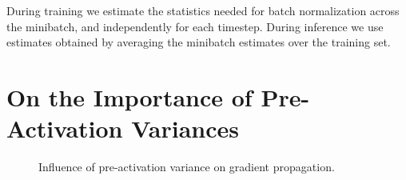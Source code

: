 \documentclass{article} %
\begin{document}

During training we estimate the statistics needed for batch normalization across the minibatch, and independently for each timestep.
During inference we use estimates obtained by averaging the minibatch estimates over the training set.




\section{On the Importance of Pre-Activation Variances}


\begin{figure}
  \center%
  \hspace{2mm}%
  \caption{
Influence of pre-activation variance on gradient propagation.
}
  \label{figure:DCNtradeoff}
\end{figure}
\end{document}
